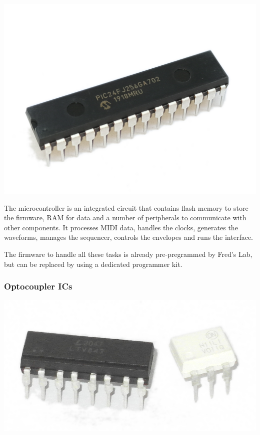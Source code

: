 \documentclass{scrartcl}
\begin{document}
\begin{center}
    \includegraphics[scale=0.08]{assets/zekit-mcu.jpg}
\end{center}

The microcontroller is an integrated circuit that contains flash memory to store the firmware, RAM for data and a number of peripherals to communicate with other components. It processes MIDI data, handles the clocks, generates the waveforms, manages the sequencer, controls the envelopes and runs the interface.

The firmware to handle all these tasks is already pre-pregrammed by Fred’s Lab, but can be replaced by using a dedicated programmer kit.

\subsubsection{Optocoupler ICs}

\begin{center}
    \includegraphics[scale=0.18]{assets/zekit-optocouplers.jpg}
\end{center}
\end{document}
